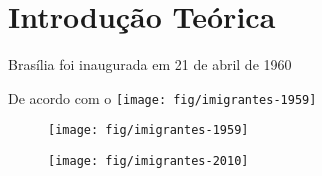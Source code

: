\chapter{Introdução Teórica}

Brasília foi inaugurada em 21 de abril de 1960

De acordo com o 
    \texttt{[image: fig/imigrantes-1959]}

\begin{figure}
    \centering
    \texttt{[image: fig/imigrantes-1959]}
    \caption{}
    \label{fig:imigrantes-1959}
\end{figure}

\begin{figure}
    \centering
    \texttt{[image: fig/imigrantes-2010]}
    \caption{}
    \label{fig:imigrantes-2010}
\end{figure}
